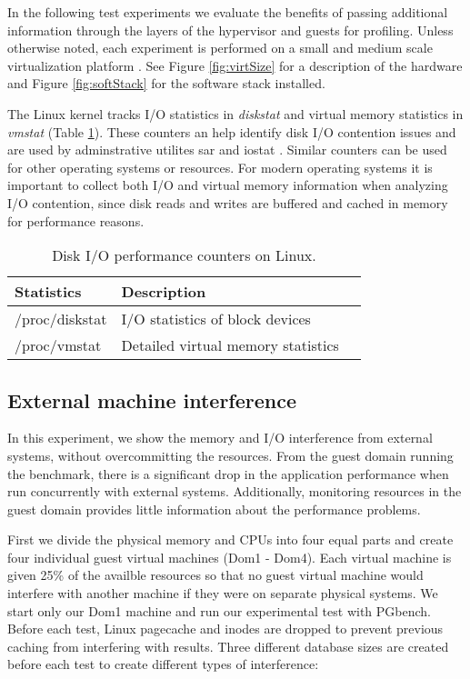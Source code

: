 In the following test experiments we evaluate the benefits of passing additional information through the layers of the hypervisor and guests for profiling.  Unless otherwise noted, each experiment is performed on a small and medium scale virtualization platform . See Figure \ref{fig:virtSize} for a description of the hardware and Figure \ref{fig:softStack} for the software stack installed.

\indent The Linux kernel tracks I/O statistics in \emph{diskstat} \cite{iostats} and virtual memory statistics in \emph{vmstat} (Table \ref{tab:iocounters}).  
These counters an help identify disk I/O contention issues and are used by adminstrative utilites sar and iostat \cite{iostats}.  
Similar counters can be used for other operating systems or resources. 
For modern operating systems it is important to collect both I/O and virtual memory information when analyzing I/O contention, since disk reads and writes are buffered and cached in memory for performance reasons. 

\begin{table}[h]
\begin{tabular}{ l l p{5cm} }
  Statistics & Description \\
  \hline
  /proc/diskstat & I/O statistics of block devices \\
  /proc/vmstat & Detailed virtual memory statistics\\
  \hline
\end{tabular}
\caption{Disk I/O performance counters on Linux.}
\label{tab:iocounters}
\end{table}

\subsection{External machine interference}
In this experiment, we show the memory and I/O interference from external systems, without overcommitting the resources.  From the guest domain running the benchmark, there is a significant drop in the application performance when run concurrently with external systems.  Additionally, monitoring resources in the guest domain provides little information about the performance problems. 

First we divide the physical memory and CPUs into four equal parts and create four individual guest virtual machines (Dom1 - Dom4).  Each virtual machine is given 25\% of the availble resources so that no guest virtual machine would interfere with another machine if they were on separate physical systems.  We start only our Dom1 machine and run our experimental test with PGbench.  Before each test, Linux pagecache and inodes are dropped to prevent previous caching from interfering with results.  Three different database sizes are created before each test to create different types of interference:

